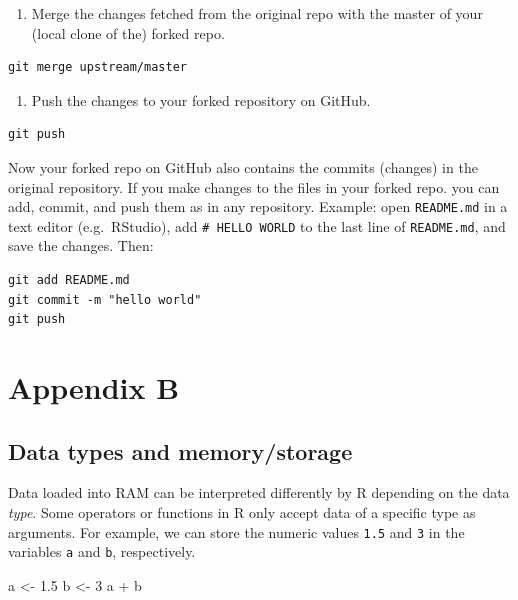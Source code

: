 \documentclass[
  12pt,
]{style/krantz}
\newenvironment{Shaded}{\begin{snugshade}}{\end{snugshade}}
\newcommand{\DecValTok}[1]{\textcolor[rgb]{0.00,0.00,0.81}{#1}}
\newcommand{\FloatTok}[1]{\textcolor[rgb]{0.00,0.00,0.81}{#1}}
\newcommand{\NormalTok}[1]{#1}
\newcommand{\OtherTok}[1]{\textcolor[rgb]{0.56,0.35,0.01}{#1}}
\newcommand{\SpecialCharTok}[1]{\textcolor[rgb]{0.00,0.00,0.00}{#1}}
\providecommand{\tightlist}{%
  \setlength{\itemsep}{0pt}\setlength{\parskip}{0pt}}
\begin{document}
\begin{enumerate}
\def\labelenumi{\arabic{enumi}.}
\setcounter{enumi}{6}
\tightlist
\item
  Merge the changes fetched from the original repo with the master of your (local clone of the) forked repo.
\end{enumerate}

\begin{verbatim}
git merge upstream/master
\end{verbatim}

\begin{enumerate}
\def\labelenumi{\arabic{enumi}.}
\setcounter{enumi}{7}
\tightlist
\item
  Push the changes to your forked repository on GitHub.
\end{enumerate}

\begin{verbatim}
git push
\end{verbatim}

Now your forked repo on GitHub also contains the commits (changes) in the original repository. If you make changes to the files in your forked repo. you can add, commit, and push them as in any repository. Example: open \texttt{README.md} in a text editor (e.g.~RStudio), add \texttt{\#\ HELLO\ WORLD} to the last line of \texttt{README.md}, and save the changes. Then:

\begin{verbatim}
git add README.md
git commit -m "hello world"
git push
\end{verbatim}

\hypertarget{appendix-b}{%
\chapter{Appendix B}\label{appendix-b}}

\hypertarget{data-types-and-memorystorage}{%
\section{Data types and memory/storage}\label{data-types-and-memorystorage}}

Data loaded into RAM can be interpreted differently by R depending on the data \emph{type}. Some operators or functions in R only accept data of a specific type as arguments. For example, we can store the numeric values \texttt{1.5} and \texttt{3} in the variables \texttt{a} and \texttt{b}, respectively.

\begin{Shaded}
\begin{Highlighting}[]
\NormalTok{a }\OtherTok{\textless{}{-}} \FloatTok{1.5}
\NormalTok{b }\OtherTok{\textless{}{-}} \DecValTok{3}
\NormalTok{a }\SpecialCharTok{+}\NormalTok{ b}
\end{Highlighting}
\end{Shaded}
\end{document}
